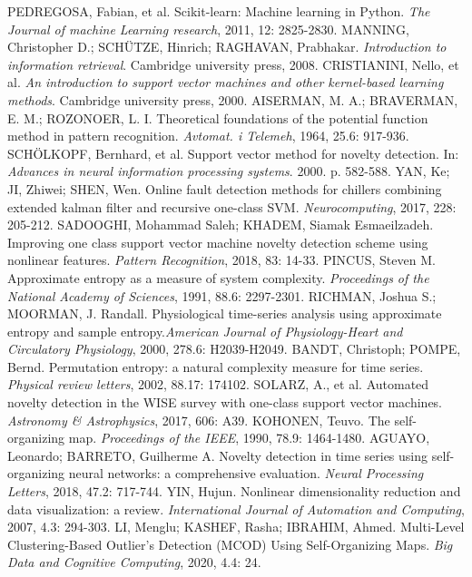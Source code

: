 \documentclass[11pt,twoside,openright]{report}
\begin{document}
\begin{thebibliography}{L}
PEDREGOSA, Fabian, et al. Scikit-learn: Machine learning in Python. \textit{The Journal of machine Learning research}, 2011, 12: 2825-2830.
MANNING, Christopher D.; SCHÜTZE, Hinrich; RAGHAVAN, Prabhakar. \textit{Introduction to information retrieval}. Cambridge university press, 2008.
CRISTIANINI, Nello, et al. \textit{An introduction to support vector machines and other kernel-based learning methods}. Cambridge university press, 2000.
AISERMAN, M. A.; BRAVERMAN, E. M.; ROZONOER, L. I. Theoretical foundations of the potential function method in pattern recognition. \textit{Avtomat. i Telemeh}, 1964, 25.6: 917-936.
SCHÖLKOPF, Bernhard, et al. Support vector method for novelty detection. In: \textit{Advances in neural information processing systems}. 2000. p. 582-588.
YAN, Ke; JI, Zhiwei; SHEN, Wen. Online fault detection methods for chillers combining extended kalman filter and recursive one-class SVM. \textit{Neurocomputing}, 2017, 228: 205-212.
SADOOGHI, Mohammad Saleh; KHADEM, Siamak Esmaeilzadeh. Improving one class support vector machine novelty detection scheme using nonlinear features. \textit{Pattern Recognition}, 2018, 83: 14-33.
PINCUS, Steven M. Approximate entropy as a measure of system complexity. \textit{Proceedings of the National Academy of Sciences}, 1991, 88.6: 2297-2301.
RICHMAN, Joshua S.; MOORMAN, J. Randall. Physiological time-series analysis using approximate entropy and sample entropy.\textit{American Journal of Physiology-Heart and Circulatory Physiology}, 2000, 278.6: H2039-H2049.
BANDT, Christoph; POMPE, Bernd. Permutation entropy: a natural complexity measure for time series. \textit{Physical review letters}, 2002, 88.17: 174102.
SOLARZ, A., et al. Automated novelty detection in the WISE survey with one-class support vector machines. \textit{Astronomy \& Astrophysics}, 2017, 606: A39.
KOHONEN, Teuvo. The self-organizing map. \textit{Proceedings of the IEEE}, 1990, 78.9: 1464-1480.
AGUAYO, Leonardo; BARRETO, Guilherme A. Novelty detection in time series using self-organizing neural networks: a comprehensive evaluation. \textit{Neural Processing Letters}, 2018, 47.2: 717-744.
YIN, Hujun. Nonlinear dimensionality reduction and data visualization: a review. \textit{International Journal of Automation and Computing}, 2007, 4.3: 294-303.
LI, Menglu; KASHEF, Rasha; IBRAHIM, Ahmed. Multi-Level Clustering-Based Outlier’s Detection (MCOD) Using Self-Organizing Maps. \textit{Big Data and Cognitive Computing}, 2020, 4.4: 24.

\end{thebibliography}
\end{document}
